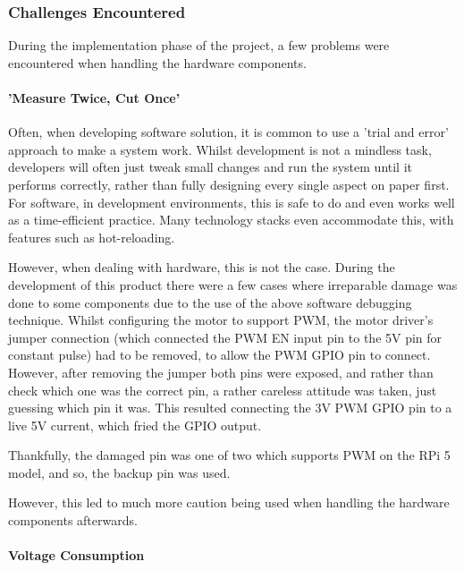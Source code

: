             \subsubsection{Challenges Encountered}
    
                During the implementation phase of the project, a few problems were encountered when handling the hardware components.
    
                \paragraph{'Measure Twice, Cut Once'}
    
                    Often, when developing software solution, it is common to use a 'trial and error' approach to make a system work. Whilst development is not a mindless task, developers will often just tweak small changes and run the system until it performs correctly, rather than fully designing every single aspect on paper first. For software, in development environments, this is safe to do and even works well as a time-efficient practice. Many technology stacks even accommodate this, with features such as hot-reloading.
    
                    However, when dealing with hardware, this is not the case. During the development of this product there were a few cases where irreparable damage was done to some components due to the use of the above software debugging technique. Whilst configuring the motor to support PWM, the motor driver's jumper connection (which connected the PWM EN input pin to the 5V pin for constant pulse) had to be removed, to allow the PWM GPIO pin to connect. However, after removing the jumper both pins were exposed, and rather than check which one was the correct pin, a rather careless attitude was taken, just guessing which pin it was. This resulted connecting the 3V PWM GPIO pin to a live 5V current, which fried the GPIO output.
    
                    Thankfully, the damaged pin was one of two which supports PWM on the RPi 5 model, and so, the backup pin was used.
    
                    However, this led to much more caution being used when handling the hardware components afterwards.
    
                \paragraph{Voltage Consumption}
    
